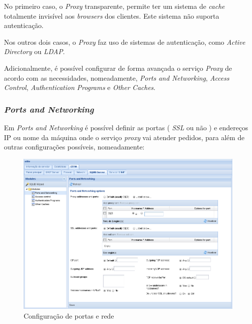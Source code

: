 No primeiro caso, o \textit{Proxy} transparente, permite ter um sistema de \textit{cache} totalmente invisível aos \textit{browsers} dos clientes. Este sistema não suporta autenticação.

Nos outros dois casos, o \textit{Proxy} faz uso de sistemas de autenticação, como \textit{Active Directory} ou \textit{LDAP}.

Adicionalmente, é possível configurar de forma avançada o serviço \textit{Proxy} de acordo com as necessidades, nomeadamente, \textit{Ports and Networking}, \textit{Access Control}, \textit{Authentication Programs} e \textit{Other Caches}.

\subsubsection{\textit{Ports and Networking}}

Em \textit{Ports and Networking} é possível definir as portas ( \textit{SSL} ou não ) e endereços IP ou nome da máquina onde o serviço \textit{proxy} vai atender pedidos, para além de outras configurações possíveis, nomeadamente:

\begin{figure}[H]
    \begin{center}
    \includegraphics[scale=0.38]{screenshots/etfw/etfw_squid_portsnetworking_01.png}
    \caption{Configuração de portas e rede}
    \label{fig:etfw_squid_portsnetworking_01}
    \end{center}
\end{figure}

